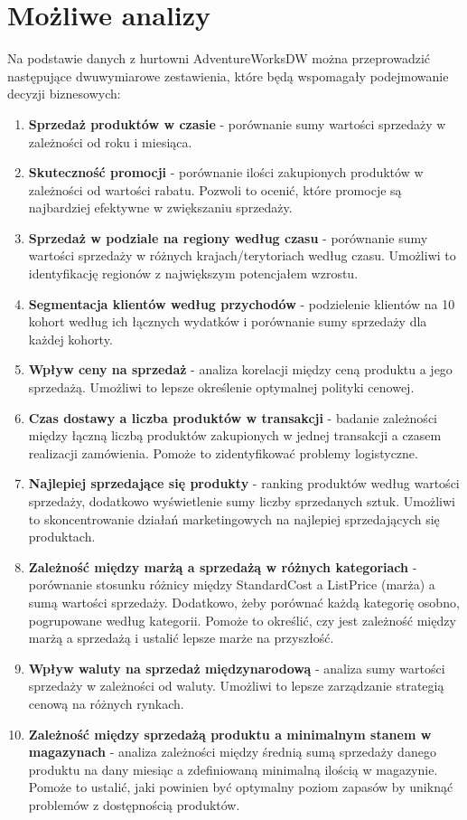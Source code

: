 \documentclass[a4paper,12pt]{article}
\begin{document}
\section{Możliwe analizy}

Na podstawie danych z hurtowni AdventureWorksDW można przeprowadzić następujące dwuwymiarowe zestawienia, które będą wspomagały podejmowanie decyzji biznesowych:

\begin{enumerate}
    \item \textbf{Sprzedaż produktów w czasie} - porównanie sumy wartości sprzedaży w zależności od roku i miesiąca.
    \item \textbf{Skuteczność promocji} - porównanie ilości zakupionych produktów w zależności od wartości rabatu.
          Pozwoli to ocenić, które promocje są najbardziej efektywne w zwiększaniu sprzedaży.
    \item \textbf{Sprzedaż w podziale na regiony według czasu} - porównanie sumy wartości sprzedaży w różnych krajach/terytoriach według czasu.
          Umożliwi to identyfikację regionów z największym potencjałem wzrostu.
    \item \textbf{Segmentacja klientów według przychodów} - podzielenie klientów na 10 kohort według ich łącznych wydatków i porównanie sumy sprzedaży dla każdej kohorty.
    \item \textbf{Wpływ ceny na sprzedaż} - analiza korelacji między ceną produktu a jego sprzedażą.
          Umożliwi to lepsze określenie optymalnej polityki cenowej.
    \item \textbf{Czas dostawy a liczba produktów w transakcji} - badanie zależności między łączną liczbą produktów zakupionych w jednej transakcji a czasem realizacji zamówienia.
          Pomoże to zidentyfikować problemy logistyczne.
    \item \textbf{Najlepiej sprzedające się produkty} - ranking produktów według wartości sprzedaży, dodatkowo wyświetlenie sumy liczby sprzedanych sztuk.
          Umożliwi to skoncentrowanie działań marketingowych na najlepiej sprzedających się produktach.
    \item \textbf{Zależność między marżą a sprzedażą w różnych kategoriach} - porównanie stosunku różnicy między StandardCost a ListPrice (marża) a sumą wartości sprzedaży. Dodatkowo, żeby porównać każdą kategorię osobno, pogrupowane według kategorii.
          Pomoże to określić, czy jest zależność między marżą a sprzedażą i ustalić lepsze marże na przyszłość.
    \item \textbf{Wpływ waluty na sprzedaż międzynarodową} - analiza sumy wartości sprzedaży w zależności od waluty.
          Umożliwi to lepsze zarządzanie strategią cenową na różnych rynkach.
    \item \textbf{Zależność między sprzedażą produktu a minimalnym stanem w magazynach} - analiza zależności między średnią sumą sprzedaży danego produktu na dany miesiąc a zdefiniowaną minimalną ilością w magazynie.
          Pomoże to ustalić, jaki powinien być optymalny poziom zapasów by uniknąć problemów z dostępnością produktów.
\end{enumerate}
\end{document}
